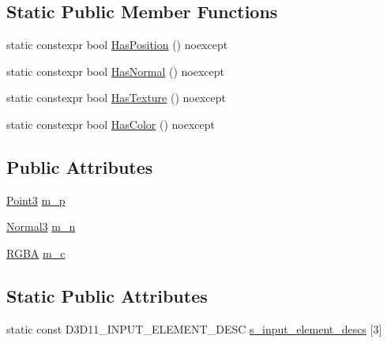 \subsection*{Static Public Member Functions}
\begin{DoxyCompactItemize}
\item 
static constexpr bool \mbox{\hyperlink{structmage_1_1rendering_1_1_vertex_position_normal_color_a1a40ced9702b3aa3a8f32ea932448aa1}{Has\+Position}} () noexcept
\item 
static constexpr bool \mbox{\hyperlink{structmage_1_1rendering_1_1_vertex_position_normal_color_a663883aaff79837d1abb1c5cb54d2340}{Has\+Normal}} () noexcept
\item 
static constexpr bool \mbox{\hyperlink{structmage_1_1rendering_1_1_vertex_position_normal_color_aef3b7dd4f11d7f2a78fe29c49b8bf6f5}{Has\+Texture}} () noexcept
\item 
static constexpr bool \mbox{\hyperlink{structmage_1_1rendering_1_1_vertex_position_normal_color_ae1d38a1d2e3f546c475849ec360f5317}{Has\+Color}} () noexcept
\end{DoxyCompactItemize}
\subsection*{Public Attributes}
\begin{DoxyCompactItemize}
\item 
\mbox{\hyperlink{structmage_1_1_point3}{Point3}} \mbox{\hyperlink{structmage_1_1rendering_1_1_vertex_position_normal_color_ad89961e1a0b0bd97f580a34709e4e05f}{m\+\_\+p}}
\item 
\mbox{\hyperlink{structmage_1_1_normal3}{Normal3}} \mbox{\hyperlink{structmage_1_1rendering_1_1_vertex_position_normal_color_abf35d5cb0057f76dbd6f153ee0f412f4}{m\+\_\+n}}
\item 
\mbox{\hyperlink{structmage_1_1_r_g_b_a}{R\+G\+BA}} \mbox{\hyperlink{structmage_1_1rendering_1_1_vertex_position_normal_color_a41410eb9dab6e73b59aac40b69637c05}{m\+\_\+c}}
\end{DoxyCompactItemize}
\subsection*{Static Public Attributes}
\begin{DoxyCompactItemize}
\item 
static const D3\+D11\+\_\+\+I\+N\+P\+U\+T\+\_\+\+E\+L\+E\+M\+E\+N\+T\+\_\+\+D\+E\+SC \mbox{\hyperlink{structmage_1_1rendering_1_1_vertex_position_normal_color_adadf05a78d26b87baef8a9c3cb80ae54}{s\+\_\+input\+\_\+element\+\_\+descs}} \mbox{[}3\mbox{]}
\end{DoxyCompactItemize}


